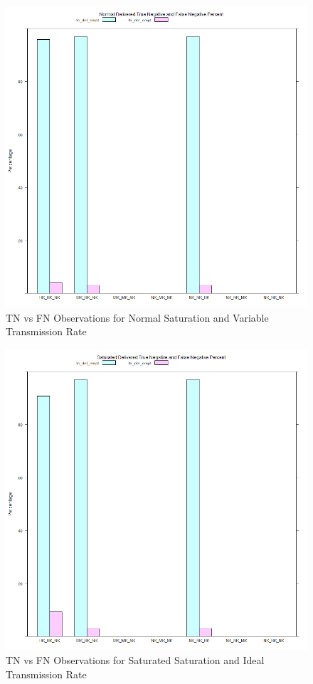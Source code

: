 	\begin{figure}[H]
	\centering
	\includegraphics[width=\textwidth]{Chap7/figures/plots/normal_variable/tnvsfn_percent.png}
	\caption{TN vs FN Observations for Normal Saturation and Variable Transmission Rate}
	\label{fig:sim:res:norm:variable:tnfn}
	\end{figure}

	\begin{figure}[H]
	\centering
	\includegraphics[width=\textwidth]{Chap7/figures/plots/saturated_ideal/tnvsfn_percent.png}
	\caption{TN vs FN Observations for Saturated Saturation and Ideal Transmission Rate}
	\label{fig:sim:res:sat:ideal:tnfn}
	\end{figure}

